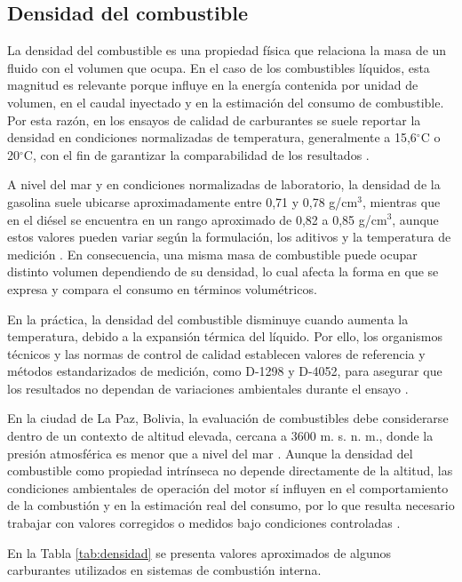 \subsection{Densidad del combustible}

La densidad del combustible es una propiedad física que relaciona la masa de un fluido con el volumen que ocupa. En el caso de los combustibles líquidos, esta magnitud es relevante porque influye en la energía contenida por unidad de volumen, en el caudal inyectado y en la estimación del consumo de combustible. Por esta razón, en los ensayos de calidad de carburantes se suele reportar la densidad en condiciones normalizadas de temperatura, generalmente a 15,6$^\circ$C o 20$^\circ$C, con el fin de garantizar la comparabilidad de los resultados \citep{ANH2014, FuelsDensityToolbox}.

A nivel del mar y en condiciones normalizadas de laboratorio, la densidad de la gasolina suele ubicarse aproximadamente entre 0,71 y 0,78 g/cm$^3$, mientras que en el diésel se encuentra en un rango aproximado de 0,82 a 0,85 g/cm$^3$, aunque estos valores pueden variar según la formulación, los aditivos y la temperatura de medición \citep{FuelsDensityToolbox}. En consecuencia, una misma masa de combustible puede ocupar distinto volumen dependiendo de su densidad, lo cual afecta la forma en que se expresa y compara el consumo en términos volumétricos.

En la práctica, la densidad del combustible disminuye cuando aumenta la temperatura, debido a la expansión térmica del líquido. Por ello, los organismos técnicos y las normas de control de calidad establecen valores de referencia y métodos estandarizados de medición, como D-1298 y D-4052, para asegurar que los resultados no dependan de variaciones ambientales durante el ensayo \citep{ANH2014}.

En la ciudad de La Paz, Bolivia, la evaluación de combustibles debe considerarse dentro de un contexto de altitud elevada, cercana a 3600 m. s. n. m., donde la presión atmosférica es menor que a nivel del mar \citep{BarometricaPaz}. Aunque la densidad del combustible como propiedad intrínseca no depende directamente de la altitud, las condiciones ambientales de operación del motor sí influyen en el comportamiento de la combustión y en la estimación real del consumo, por lo que resulta necesario trabajar con valores corregidos o medidos bajo condiciones controladas \citep{ANH2014}.

En la Tabla \ref{tab:densidad} se presenta valores aproximados de algunos carburantes utilizados en sistemas de combustión interna.


